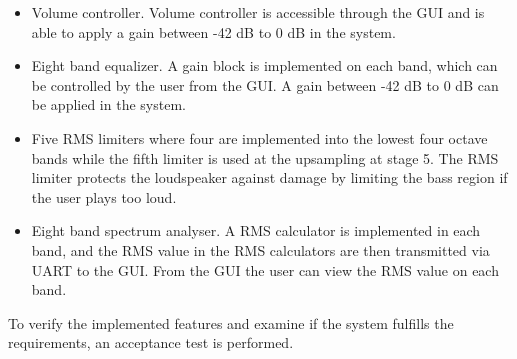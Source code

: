 \begin{itemize}
\item Volume controller. Volume controller is accessible through the GUI and is able to apply a gain between -42 dB to 0 dB in the system.
\item Eight band equalizer. A gain block is implemented on each band, which can be controlled by the user from the GUI. A gain between -42 dB to 0 dB can be applied in the system.
\item Five RMS limiters where four are implemented into the lowest four octave bands while the fifth limiter is used at the upsampling at stage 5. The RMS limiter protects the loudspeaker against damage by limiting the bass region if the user plays too loud. 
\item Eight band spectrum analyser. A RMS calculator is implemented in each band, and the RMS value in the RMS calculators are then transmitted via UART to the GUI. From the GUI the user can view the RMS value on each band.
\end{itemize}

To verify the implemented features and examine if the system fulfills the requirements, an acceptance test is performed.



